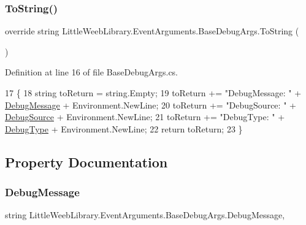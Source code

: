 \subsubsection{\texorpdfstring{To\+String()}{ToString()}}
{\footnotesize\ttfamily override string Little\+Weeb\+Library.\+Event\+Arguments.\+Base\+Debug\+Args.\+To\+String (\begin{DoxyParamCaption}{ }\end{DoxyParamCaption})}



Definition at line 16 of file Base\+Debug\+Args.\+cs.


\begin{DoxyCode}
17         \{
18             \textcolor{keywordtype}{string} toReturn = \textcolor{keywordtype}{string}.Empty;
19             toReturn += \textcolor{stringliteral}{"DebugMessage: "} + \mbox{\hyperlink{class_little_weeb_library_1_1_event_arguments_1_1_base_debug_args_ab2d00faa48751515043b173742b84857}{DebugMessage}} + Environment.NewLine;
20             toReturn += \textcolor{stringliteral}{"DebugSource: "} + \mbox{\hyperlink{class_little_weeb_library_1_1_event_arguments_1_1_base_debug_args_a13caf826c18316458f6cc474853dc774}{DebugSource}} + Environment.NewLine;
21             toReturn += \textcolor{stringliteral}{"DebugType: "} + \mbox{\hyperlink{class_little_weeb_library_1_1_event_arguments_1_1_base_debug_args_aa2822d085deabfeb175824f22a114f1f}{DebugType}} + Environment.NewLine;
22             \textcolor{keywordflow}{return} toReturn;
23         \}
\end{DoxyCode}


\subsection{Property Documentation}
\mbox{\label{class_little_weeb_library_1_1_event_arguments_1_1_base_debug_args_ab2d00faa48751515043b173742b84857}} 
\subsubsection{\texorpdfstring{Debug\+Message}{DebugMessage}}
{\footnotesize\ttfamily string Little\+Weeb\+Library.\+Event\+Arguments.\+Base\+Debug\+Args.\+Debug\+Message\hspace{0.3cm}{\ttfamily [get]}, {\ttfamily [set]}}



